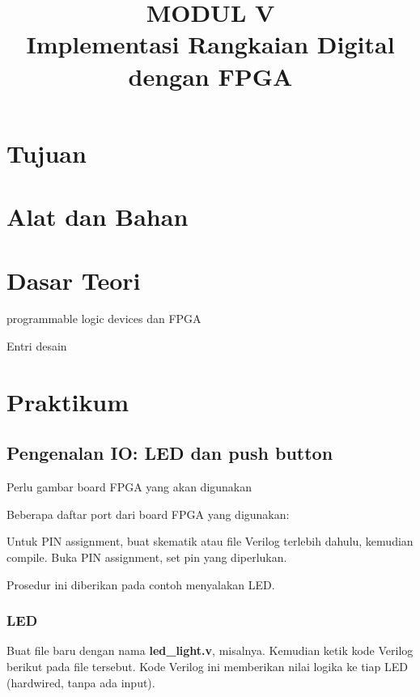 \documentclass[a4paper,12pt,bahasa]{extarticle}
\begin{document}
\title{MODUL V \\
Implementasi Rangkaian Digital dengan FPGA}
\author{}
\date{}
\maketitle

\section{Tujuan}

\section{Alat dan Bahan}


\section{Dasar Teori}

programmable logic devices dan FPGA

Entri desain





\section{Praktikum}

\subsection{Pengenalan IO: LED dan push button}

{\color{red} Perlu gambar board FPGA yang akan digunakan}

Beberapa daftar port dari board FPGA yang digunakan:



Untuk PIN assignment, buat skematik atau file Verilog terlebih dahulu, kemudian compile.
Buka PIN assignment, set pin yang diperlukan.

Prosedur ini diberikan pada contoh menyalakan LED.

\subsubsection{LED}

Buat file baru dengan nama \textbf{led\_light.v}, misalnya.
Kemudian ketik kode Verilog berikut pada file tersebut.
Kode Verilog ini memberikan nilai logika ke tiap
LED (hardwired, tanpa ada input).
\end{document}

